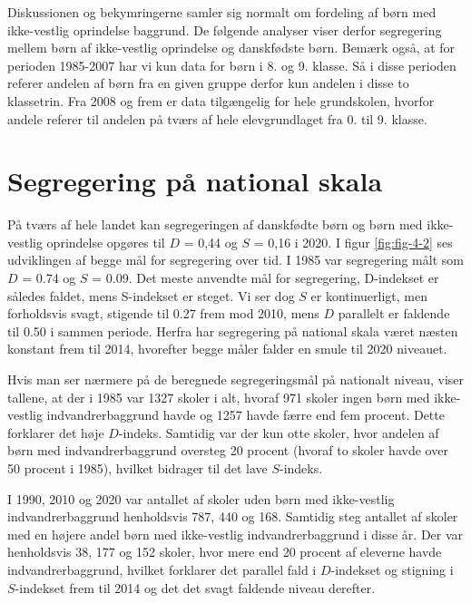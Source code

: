 \documentclass[
]{book}
\begin{document}
Diskussionen og bekymringerne samler sig normalt om fordeling af børn med ikke-vestlig oprindelse baggrund. De følgende analyser viser derfor segregering mellem børn af ikke-vestlig oprindelse og danskfødste børn. Bemærk også, at for perioden 1985-2007 har vi kun data for børn i 8. og 9. klasse. Så i disse perioden referer andelen af børn fra en given gruppe derfor kun andelen i disse to klassetrin. Fra 2008 og frem er data tilgængelig for hele grundskolen, hvorfor andele referer til andelen på tværs af hele elevgrundlaget fra 0. til 9. klasse.

\section{Segregering på national skala}\label{segregering-puxe5-national-skala}

På tværs af hele landet kan segregeringen af danskfødte børn og børn med ikke-vestlig oprindelse opgøres til \(D\) = 0,44 og \(S\) = 0,16 i 2020. I figur \ref{fig:fig-4-2} ses udviklingen af begge mål for segregering over tid. I 1985 var segregering målt som \(D\) = 0.74 og \(S\) = 0.09. Det meste anvendte mål for segregering, D-indekset er således faldet, mens S-indekset er steget. Vi ser dog \(S\) er kontinuerligt, men forholdsvis svagt, stigende til 0.27 frem mod 2010, mens \(D\) parallelt er faldende til 0.50 i sammen periode. Herfra har segregering på national skala været næsten konstant frem til 2014, hvorefter begge måler falder en smule til 2020 niveauet.

Hvis man ser nærmere på de beregnede segregeringsmål på nationalt niveau, viser tallene, at der i 1985 var 1327 skoler i alt, hvoraf 971 skoler ingen børn med ikke-vestlig indvandrerbaggrund havde og 1257 havde færre end fem procent. Dette forklarer det høje \(D\)-indeks. Samtidig var der kun otte skoler, hvor andelen af børn med indvandrerbaggrund oversteg 20 procent (hvoraf to skoler havde over 50 procent i 1985), hvilket bidrager til det lave \(S\)-indeks.

I 1990, 2010 og 2020 var antallet af skoler uden børn med ikke-vestlig indvandrerbaggrund henholdsvis 787, 440 og 168. Samtidig steg antallet af skoler med en højere andel børn med ikke-vestlig indvandrerbaggrund i disse år. Der var henholdsvis 38, 177 og 152 skoler, hvor mere end 20 procent af eleverne havde indvandrerbaggrund, hvilket forklarer det parallel fald i \(D\)-indekset og stigning i \(S\)-indekset frem til 2014 og det det svagt faldende niveau derefter.
\end{document}
